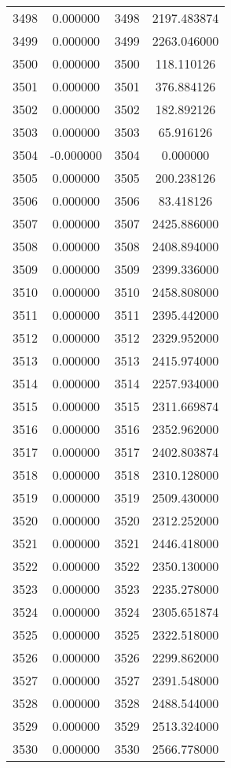 \documentclass[12pt]{article}
\begin{document}
\begin{longtable}{@{}cccc@{}}
3498 & 0.000000 & 3498 & 2197.483874 \\
3499 & 0.000000 & 3499 & 2263.046000 \\
3500 & 0.000000 & 3500 & 118.110126 \\
3501 & 0.000000 & 3501 & 376.884126 \\
3502 & 0.000000 & 3502 & 182.892126 \\
3503 & 0.000000 & 3503 & 65.916126 \\
3504 & -0.000000 & 3504 & 0.000000 \\
3505 & 0.000000 & 3505 & 200.238126 \\
3506 & 0.000000 & 3506 & 83.418126 \\
3507 & 0.000000 & 3507 & 2425.886000 \\
3508 & 0.000000 & 3508 & 2408.894000 \\
3509 & 0.000000 & 3509 & 2399.336000 \\
3510 & 0.000000 & 3510 & 2458.808000 \\
3511 & 0.000000 & 3511 & 2395.442000 \\
3512 & 0.000000 & 3512 & 2329.952000 \\
3513 & 0.000000 & 3513 & 2415.974000 \\
3514 & 0.000000 & 3514 & 2257.934000 \\
3515 & 0.000000 & 3515 & 2311.669874 \\
3516 & 0.000000 & 3516 & 2352.962000 \\
3517 & 0.000000 & 3517 & 2402.803874 \\
3518 & 0.000000 & 3518 & 2310.128000 \\
3519 & 0.000000 & 3519 & 2509.430000 \\
3520 & 0.000000 & 3520 & 2312.252000 \\
3521 & 0.000000 & 3521 & 2446.418000 \\
3522 & 0.000000 & 3522 & 2350.130000 \\
3523 & 0.000000 & 3523 & 2235.278000 \\
3524 & 0.000000 & 3524 & 2305.651874 \\
3525 & 0.000000 & 3525 & 2322.518000 \\
3526 & 0.000000 & 3526 & 2299.862000 \\
3527 & 0.000000 & 3527 & 2391.548000 \\
3528 & 0.000000 & 3528 & 2488.544000 \\
3529 & 0.000000 & 3529 & 2513.324000 \\
3530 & 0.000000 & 3530 & 2566.778000 \\

\end{longtable}
\end{document}
